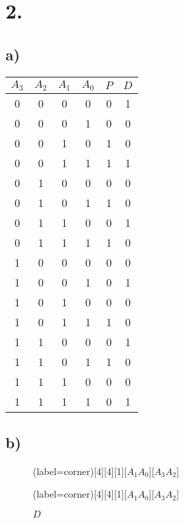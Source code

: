 \documentclass[a4paper,12pt]{article}
\begin{document}
\section*{2.}

\subsection*{a)}
\begin{center}
	\begin{tabular}{cccccc}
		\toprule
		$A_3$ & $A_2$ & $A_1$ & $A_0$ & $P$ & $D$ \\
		\midrule
		0 & 0 & 0 & 0 & 0 & 1 \\ 
        0 & 0 & 0 & 1 & 0 & 0 \\ 
        0 & 0 & 1 & 0 & 1 & 0 \\ 
        0 & 0 & 1 & 1 & 1 & 1 \\ 
        0 & 1 & 0 & 0 & 0 & 0 \\ 
        0 & 1 & 0 & 1 & 1 & 0 \\ 
        0 & 1 & 1 & 0 & 0 & 1 \\ 
        0 & 1 & 1 & 1 & 1 & 0 \\ 
        1 & 0 & 0 & 0 & 0 & 0 \\ 
        1 & 0 & 0 & 1 & 0 & 1 \\ 
        1 & 0 & 1 & 0 & 0 & 0 \\ 
        1 & 0 & 1 & 1 & 1 & 0 \\ 
        1 & 1 & 0 & 0 & 0 & 1 \\ 
        1 & 1 & 0 & 1 & 1 & 0 \\ 
        1 & 1 & 1 & 0 & 0 & 0 \\ 
        1 & 1 & 1 & 1 & 0 & 1 \\ 
		\bottomrule
	\end{tabular}
\end{center}

\subsection*{b)}
\begin{figure}[H]
	\begin{minipage}{0.5\linewidth}
		\centering
		\begin{karnaugh-map}(label=corner)[4][4][1][$A_1A_0$][$A_3A_2$]
			\autoterms[0]
		\end{karnaugh-map}
		\caption*{$P$}
	\end{minipage}
	\begin{minipage}{0.5\linewidth}
		\centering
		\begin{karnaugh-map}(label=corner)[4][4][1][$A_1A_0$][$A_3A_2$]
			\autoterms[0]
		\end{karnaugh-map}
		\caption*{$D$}
	\end{minipage}
\end{figure}
\end{document}
